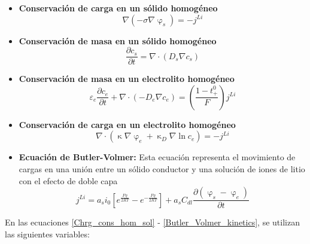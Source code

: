 \documentclass[10pt,a4paper]{article}
\begin{document}
\begin{itemize}
    \item \textbf{Conservaci\'on de carga en un s\'olido homog\'eneo}
        \begin{equation}
            \nabla (-\sigma\nabla\upvarphi_s)=-j^{Li} 
            \label{Chrg_cons_hom_sol}
        \end{equation}	
    \item \textbf{Conservaci\'on de masa en un s\'olido homog\'eneo}
        \begin{equation}
            \frac{\partial c_s}{\partial t}=\nabla \cdot (D_s\nabla c_s) 
            \label{Mass_cons_hom_sol}
        \end{equation}	
    \item \textbf{Conservaci\'on de masa en un electrolito homog\'eneo}
        \begin{equation}
            \varepsilon_e\frac{\partial c_e}{\partial t} + \nabla \cdot
            (-D_e\nabla c_e) = \left(\frac{1-t_+^0}{F}\right)j^{Li}
            \label{Mass_cons_hom_electrolyte}
        \end{equation}	
    \item \textbf{Conservaci\'on de carga en un electrolito homog\'eneo}
        \begin{equation}
            \nabla \cdot (\upkappa \nabla \upvarphi_e + \upkappa_D \nabla \ln 
            c_e) = -j^{Li}
            \label{Chrg_cons_hom_electrolyte}
        \end{equation}	
    \item \textbf{Ecuaci\'on de Butler-Volmer:} Esta ecuaci\'on representa el
        movimiento de cargas en una uni\'on entre un s\'olido conductor y una
        soluci\'on de iones de litio con el efecto de doble capa
        \begin{equation}
            j^{Li} =
            a_si_0\left[{e^\frac{F\eta}{2RT}-e^{-\frac{F\eta}{2RT}}}\right] + 
            a_sC_{dl}\frac{\partial{(\upvarphi_s - \upvarphi_e)}}{\partial t}
            \label{Butler_Volmer_kinetics}
        \end{equation}	
\end{itemize}

\noindent En las ecuaciones \ref{Chrg_cons_hom_sol} - 
\ref{Butler_Volmer_kinetics}, se utilizan las siguientes variables:
\end{document}
